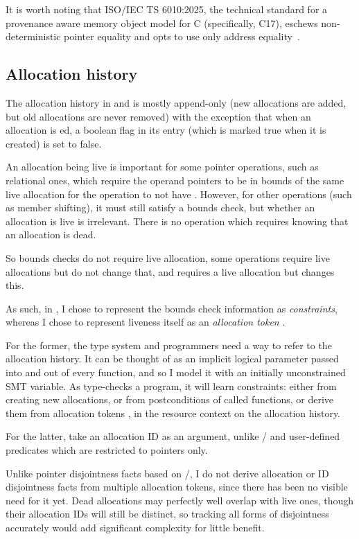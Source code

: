 It is worth noting that ISO/IEC TS 6010:2025, the technical standard for a
provenance aware memory object model for C (specifically, C17), eschews
non-deterministic pointer equality and opts to use only address
equality~.

\subsection{Allocation history}\label{subsec:alloc-history}

The allocation history in  and  is mostly append-only
(new allocations are added, but old allocations are never removed) with the
exception that when an allocation is ed, a boolean flag in its
entry (which is marked true when it is created) is set to false.

An allocation being live is important for some pointer operations, such as
relational ones, which require the operand pointers to be in bounds of the same
live allocation for the operation to not have . However, for other
operations (such as member shifting), it must still satisfy a bounds check, but
whether an allocation is live is irrelevant. There is no operation which
requires knowing that an allocation is dead.

So bounds checks do not require live allocation, some operations require
live allocations but do not change that, and  requires
a live allocation but changes this.

As such, in , I chose to represent the bounds check information as
\emph{constraints}, whereas I chose to represent liveness itself as an
\emph{allocation token} .

For the former, the type system and programmers need a way to refer to the
allocation history. It can be thought of as an implicit logical parameter
passed into and out of every function, and so I model it with an initially
unconstrained SMT variable. As  type-checks a  program, it
will learn constraints: either from creating new allocations, or from
postconditions of called functions, or derive them from allocation tokens
, in the resource context on the allocation history.

For the latter,  take an allocation ID as an argument,
unlike / and user-defined predicates
which are restricted to pointers only.

Unlike pointer disjointness facts based on /, I do
not derive allocation or ID disjointness facts from
multiple allocation tokens, since there has been no visible need for it
yet.\label{sn:ptr-eq-annotation} Dead allocations may perfectly well overlap
with live ones, though their allocation IDs will still be distinct, so tracking
all forms of disjointness accurately would add significant complexity for
little benefit.

